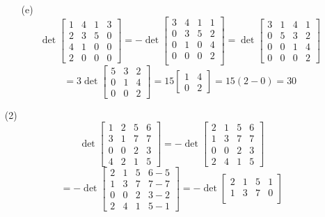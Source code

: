 \begin{itemize}
\begin{itemize}
\item[(e)]
$$\det\begin{bmatrix}
1 & 4 & 1 & 3 \\
2 & 3 & 5 & 0 \\
4 & 1 & 0 & 0 \\
2 & 0 & 0 & 0
\end{bmatrix} = -\det\begin{bmatrix}
3 & 4 & 1 & 1 \\
0 & 3 & 5 & 2 \\
0 & 1 & 0 & 4 \\
0 & 0 & 0 & 2 \\
\end{bmatrix} = \det\begin{bmatrix}
3 & 1 & 4 & 1 \\
0 & 5 & 3 & 2 \\
0 & 0 & 1 & 4 \\
0 & 0 & 0 & 2
\end{bmatrix}$$
$$= 3\det\begin{bmatrix}
5 & 3 & 2 \\
0 & 1 & 4 \\
0 & 0 & 2
\end{bmatrix} = 15\begin{bmatrix}
1 & 4 \\
0 & 2
\end{bmatrix} = 15(2 - 0) = 30$$
\end{itemize}
\item[(2)]
$$\det\begin{bmatrix}
1 & 2 & 5 & 6 \\
3 & 1 & 7 & 7 \\
0 & 0 & 2 & 3 \\
4 & 2 & 1 & 5
\end{bmatrix} = -\det\begin{bmatrix}
2 & 1 & 5 & 6 \\
1 & 3 & 7 & 7 \\
0 & 0 & 2 & 3 \\
2 & 4 & 1 & 5
\end{bmatrix}$$
$$= -\det\begin{bmatrix}
2 & 1 & 5 & 6-5 \\
1 & 3 & 7 & 7-7 \\
0 & 0 & 2 & 3-2 \\
2 & 4 & 1 & 5-1
\end{bmatrix} = -\det\begin{bmatrix}
2 & 1 & 5 & 1 \\
1 & 3 & 7 & 0 \\

\end{bmatrix}$$
\end{itemize}
